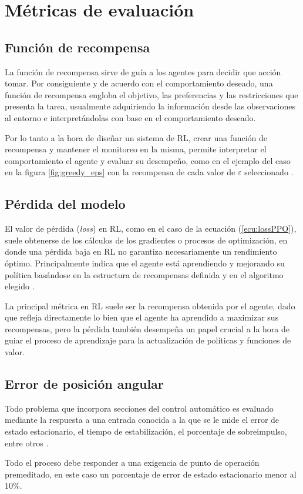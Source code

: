 \section{Métricas de evaluación}

\subsection{Función de recompensa}

La función de recompensa sirve de guía a los agentes para decidir que acción tomar. Por consiguiente y de acuerdo con el comportamiento deseado, una función de recompensa engloba el objetivo, las preferencias y las restricciones que presenta la tarea, usualmente adquiriendo la información desde las observaciones al entorno e interpretándolas con base en el comportamiento deseado.

Por lo tanto a la hora de diseñar un sistema de RL, crear una función de recompensa y mantener el monitoreo en la misma, permite interpretar el comportamiento el agente y evaluar su desempeño, como en el ejemplo del caso en la figura \ref{fig:greedy_eps} con la recompensa de cada valor de $\varepsilon$ seleccionado \cite{DataScience}.

\subsection{Pérdida del modelo}

El valor de pérdida (\textit{loss}) en RL, como en el caso de la ecuación (\ref{ecu:lossPPO}), suele obtenerse de los cálculos de los gradientes o procesos de optimización, en donde una pérdida baja en RL no garantiza necesariamente un rendimiento óptimo. Principalmente indica que el agente está aprendiendo y mejorando su política basándose en la estructura de recompensas definida y en el algoritmo elegido \cite{DataScience}.

La principal métrica en RL suele ser la recompensa obtenida por el agente, dado que refleja directamente lo bien que el agente ha aprendido a maximizar sus recompensas, pero la pérdida también desempeña un papel crucial a la hora de guiar el proceso de aprendizaje para la actualización de políticas y funciones de valor.



\subsection{Error de posición angular}

Todo problema que incorpora secciones del control automático es evaluado mediante la respuesta a una entrada conocida a la que se le mide el error de estado estacionario, el tiempo de estabilización, el porcentaje de sobreimpulso, entre otros \cite{Nise}\cite{Ogata}.

Todo el proceso debe responder a una exigencia de punto de operación premeditado, en este caso un porcentaje de error de estado estacionario menor al $10\%$.